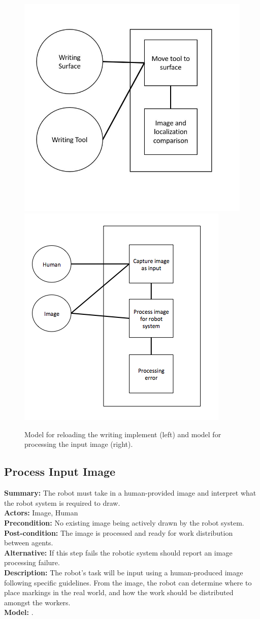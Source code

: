 \begin{figure}
 \centering
  \includegraphics[width=0.48\columnwidth]{figs/use_case-use_writing_implement.jpg}
  \includegraphics[width=0.48\columnwidth]{figs/use_case-process_input_image.jpg}
 \label{fig:reload_implement_and_image}
 \caption{Model for reloading the writing implement (left) and model for processing the input image (right).}
\end{figure}

\subsection{Process Input Image}
\textbf{Summary:} The robot must take in a human-provided image and interpret what the robot system is required to draw. \\
\textbf{Actors:} Image, Human \\
\textbf{Precondition:}  No existing image being actively drawn by the robot system. \\
\textbf{Post-condition:} The image is processed and ready for work distribution between agents. \\
\textbf{Alternative:} If this step fails the robotic system should report an image processing failure. \\
\textbf{Description:} The robot's task will be input using a human-produced image following specific guidelines. From the image, the robot can determine where to place markings in the real world, and how the work should be distributed amongst the workers. \\
\textbf{Model:} .\\


